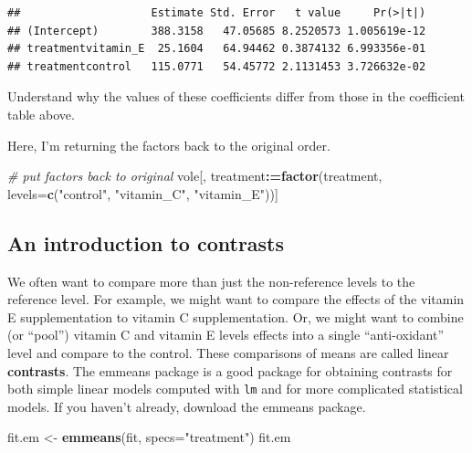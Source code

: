 \documentclass[]{book}
\newenvironment{Shaded}{\begin{snugshade}}{\end{snugshade}}
\newcommand{\KeywordTok}[1]{\textcolor[rgb]{0.13,0.29,0.53}{\textbf{#1}}}
\newcommand{\DataTypeTok}[1]{\textcolor[rgb]{0.13,0.29,0.53}{#1}}
\newcommand{\StringTok}[1]{\textcolor[rgb]{0.31,0.60,0.02}{#1}}
\newcommand{\CommentTok}[1]{\textcolor[rgb]{0.56,0.35,0.01}{\textit{#1}}}
\newcommand{\OperatorTok}[1]{\textcolor[rgb]{0.81,0.36,0.00}{\textbf{#1}}}
\newcommand{\ErrorTok}[1]{\textcolor[rgb]{0.64,0.00,0.00}{\textbf{#1}}}
\newcommand{\NormalTok}[1]{#1}
\begin{document}
\begin{verbatim}
##                    Estimate Std. Error   t value     Pr(>|t|)
## (Intercept)        388.3158   47.05685 8.2520573 1.005619e-12
## treatmentvitamin_E  25.1604   64.94462 0.3874132 6.993356e-01
## treatmentcontrol   115.0771   54.45772 2.1131453 3.726632e-02
\end{verbatim}

Understand why the values of these coefficients differ from those in the
coefficient table above.

Here, I'm returning the factors back to the original order.

\begin{Shaded}
\begin{Highlighting}[]
\CommentTok{# put factors back to original}
\NormalTok{vole[, treatment}\OperatorTok{:}\ErrorTok{=}\KeywordTok{factor}\NormalTok{(treatment, }
                         \DataTypeTok{levels=}\KeywordTok{c}\NormalTok{(}\StringTok{"control"}\NormalTok{, }\StringTok{"vitamin_C"}\NormalTok{, }\StringTok{"vitamin_E"}\NormalTok{))]}
\end{Highlighting}
\end{Shaded}

\subsection{An introduction to
contrasts}\label{an-introduction-to-contrasts}

We often want to compare more than just the non-reference levels to the
reference level. For example, we might want to compare the effects of
the vitamin E supplementation to vitamin C supplementation. Or, we might
want to combine (or ``pool'') vitamin C and vitamin E levels effects
into a single ``anti-oxidant'' level and compare to the control. These
comparisons of means are called linear \textbf{contrasts}. The emmeans
package is a good package for obtaining contrasts for both simple linear
models computed with \texttt{lm} and for more complicated statistical
models. If you haven't already, download the emmeans package.

\begin{Shaded}
\begin{Highlighting}[]
\NormalTok{fit.em <-}\StringTok{ }\KeywordTok{emmeans}\NormalTok{(fit, }\DataTypeTok{specs=}\StringTok{"treatment"}\NormalTok{)}
\NormalTok{fit.em}
\end{Highlighting}
\end{Shaded}
\end{document}
